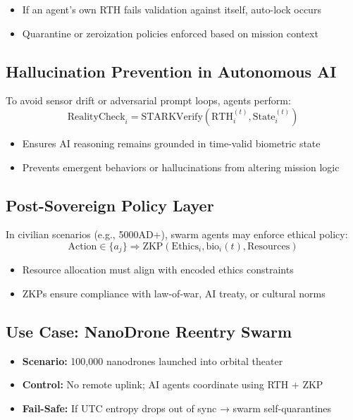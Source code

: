 \documentclass{article}
\begin{document}
\begin{itemize}
    \item If an agent's own RTH fails validation against itself, auto-lock occurs
    \item Quarantine or zeroization policies enforced based on mission context
\end{itemize}

\subsection*{Hallucination Prevention in Autonomous AI}

To avoid sensor drift or adversarial prompt loops, agents perform:
\[
\text{RealityCheck}_i = \text{STARKVerify}(\text{RTH}_i^{(t)}, \text{State}_i^{(t)})
\]

\begin{itemize}
    \item Ensures AI reasoning remains grounded in time-valid biometric state
    \item Prevents emergent behaviors or hallucinations from altering mission logic
\end{itemize}

\subsection*{Post-Sovereign Policy Layer}

In civilian scenarios (e.g., 5000AD+), swarm agents may enforce ethical policy:
\[
\text{Action} \in \{a_j\} \Rightarrow \text{ZKP}(\text{Ethics}_i, \text{bio}_i(t), \text{Resources})
\]

\begin{itemize}
    \item Resource allocation must align with encoded ethics constraints
    \item ZKPs ensure compliance with law-of-war, AI treaty, or cultural norms
\end{itemize}

\subsection*{Use Case: NanoDrone Reentry Swarm}

\begin{itemize}
    \item \textbf{Scenario:} 100,000 nanodrones launched into orbital theater
    \item \textbf{Control:} No remote uplink; AI agents coordinate using RTH + ZKP
    \item \textbf{Fail-Safe:} If UTC entropy drops out of sync → swarm self-quarantines
\end{itemize}
\end{document}
